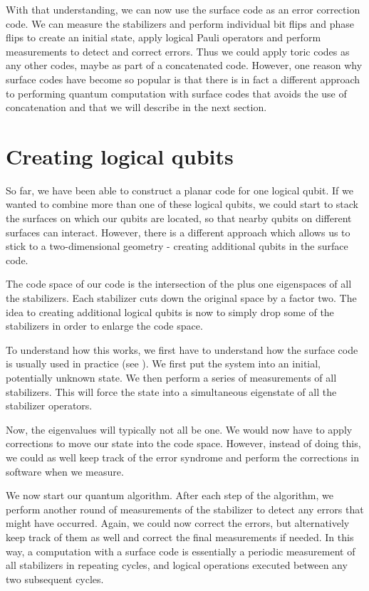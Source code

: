 \documentclass[a4paper, draft]{article}
\theoremstyle{own}
\theoremstyle{remark}
\begin{document}
With that understanding, we can now use the surface code as an error correction code. We can measure the stabilizers and perform individual bit flips and phase flips to create an initial state, apply logical Pauli operators and perform measurements to detect and correct errors. Thus we could apply toric codes as any other codes, maybe as part of a concatenated code. However, one reason why surface codes have become so popular is that there is in fact a different approach to performing quantum computation with surface codes that avoids the use of concatenation and that we will describe in the next section.

\section{Creating logical qubits}

So far, we have been able to construct a planar code for one logical qubit. If we wanted to combine more than one of these logical qubits, we could start to stack the surfaces on which our qubits are located, so that nearby qubits on different surfaces can interact. However, there is a different approach which allows us to stick to a two-dimensional geometry - creating additional qubits in the surface code.

The code space of our code is the intersection of the plus one eigenspaces of all the stabilizers. Each stabilizer cuts down the original space by a factor two. The idea to creating additional logical qubits is now to simply drop some of the stabilizers in order to enlarge the code space.

To understand how this works, we first have to understand how the surface code is usually used in practice (see \cite{SurfaceCodes}). We first put the system into an initial, potentially unknown state. We then perform a series of measurements of all stabilizers. This will force the state into a simultaneous eigenstate of all the stabilizer operators.

Now, the eigenvalues will typically not all be one. We would now have to apply corrections to move our state into the code space. However, instead of doing this, we could as well keep track of the error syndrome and perform the corrections in software when we measure. 

We now start our quantum algorithm. After each step of the algorithm, we perform another round of measurements of the stabilizer to detect any errors that might have occurred. Again, we could now correct the errors, but alternatively keep track of them as well and correct the final measurements if needed. In this way, a computation with a surface code is essentially a periodic measurement of all stabilizers in repeating cycles, and logical operations executed between any two subsequent cycles.
\end{document}

